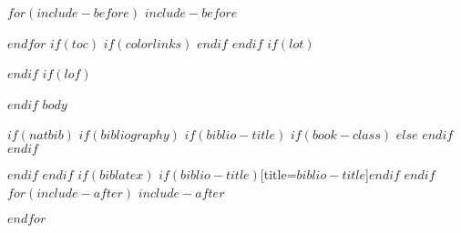 \documentclass[
    twoside,
    numbers=noenddot,
    headinclude,
    footinclude=false, %
    paper=a4,
    11pt,
]{report}
\renewcommand{\bibname}{References}
\begin{document}
$for(include-before)$
$include-before$

$endfor$
$if(toc)$
{
    $if(colorlinks)$
    \hypersetup{linkcolor=$if(toccolor)$$toccolor$$else$$endif$}
    $endif$
    \setcounter{tocdepth}{$toc-depth$}
    \tableofcontents
}
$endif$
$if(lot)$
\listoftables
$endif$
$if(lof)$
\listoffigures
$endif$
$body$

$if(natbib)$
$if(bibliography)$
$if(biblio-title)$
$if(book-class)$
\renewcommand\bibname{$biblio-title$}
$else$
\renewcommand\refname{$biblio-title$}
$endif$
$endif$


$endif$
$endif$
$if(biblatex)$
\printbibliography$if(biblio-title)$[title=$biblio-title$]$endif$
$endif$
$for(include-after)$
$include-after$

$endfor$
\end{document}
